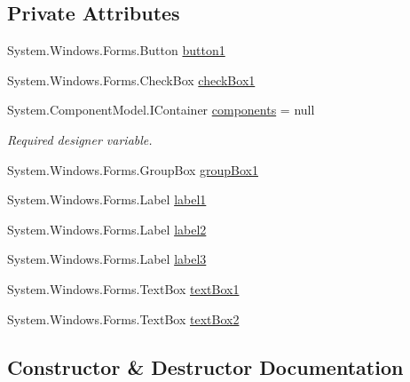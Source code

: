 \subsection*{Private Attributes}
\begin{DoxyCompactItemize}
\item 
System.\+Windows.\+Forms.\+Button \hyperlink{class__7___doroshenko__forms2__is52_1_1_registration_form_a0969f7dda97cb1a0774ba82cf50d937d}{button1}
\item 
System.\+Windows.\+Forms.\+Check\+Box \hyperlink{class__7___doroshenko__forms2__is52_1_1_registration_form_a349b6d0a9cdec2154683ad46314becec}{check\+Box1}
\item 
System.\+Component\+Model.\+I\+Container \hyperlink{class__7___doroshenko__forms2__is52_1_1_registration_form_a9c6d1cba2114e5bf8b97965125f59efb}{components} = null
\begin{DoxyCompactList}\small\item\em Required designer variable. \end{DoxyCompactList}\item 
System.\+Windows.\+Forms.\+Group\+Box \hyperlink{class__7___doroshenko__forms2__is52_1_1_registration_form_a7102bc2a8b2b1e7d4513e3aea9050967}{group\+Box1}
\item 
System.\+Windows.\+Forms.\+Label \hyperlink{class__7___doroshenko__forms2__is52_1_1_registration_form_a76d19f2e5e248f3c7079a4c8868d433e}{label1}
\item 
System.\+Windows.\+Forms.\+Label \hyperlink{class__7___doroshenko__forms2__is52_1_1_registration_form_a6447fadbd4b8ac7f12793343aa495d0c}{label2}
\item 
System.\+Windows.\+Forms.\+Label \hyperlink{class__7___doroshenko__forms2__is52_1_1_registration_form_a13535a4fbcd44915738b89204d247c8c}{label3}
\item 
System.\+Windows.\+Forms.\+Text\+Box \hyperlink{class__7___doroshenko__forms2__is52_1_1_registration_form_a060926bb200b7846ce98b37e400b702f}{text\+Box1}
\item 
System.\+Windows.\+Forms.\+Text\+Box \hyperlink{class__7___doroshenko__forms2__is52_1_1_registration_form_adfbd86af9d8bb7f6e3ff355e99f95f47}{text\+Box2}
\end{DoxyCompactItemize}


\subsection{Constructor \& Destructor Documentation}
\hypertarget{class__7___doroshenko__forms2__is52_1_1_registration_form_aba6aa95f4dc1f3d80399b15c141be71f}{}\label{class__7___doroshenko__forms2__is52_1_1_registration_form_aba6aa95f4dc1f3d80399b15c141be71f} 
